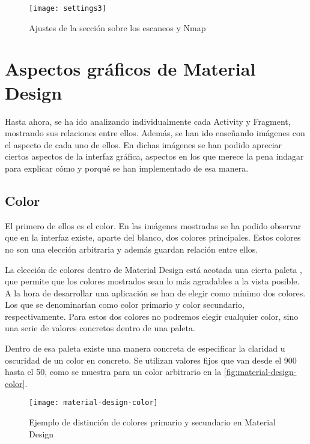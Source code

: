 \begin{figure}[H]
	\centering
	\texttt{[image: settings3]}
	\caption{Ajustes de la sección sobre los escaneos y Nmap}
	\label{fig:settings3}
\end{figure}

\section{Aspectos gráficos de Material Design}

Hasta ahora, se ha ido analizando individualmente cada Activity y Fragment, mostrando sus relaciones entre ellos. Además, se han ido enseñando imágenes con el aspecto de cada uno de ellos. En dichas imágenes se han podido apreciar ciertos aspectos de la interfaz gráfica, aspectos en los que merece la pena indagar para explicar cómo y porqué se han implementado de esa manera.

\subsection{Color}

El primero de ellos es el color. En las imágenes mostradas se ha podido observar que en la interfaz existe, aparte del blanco, dos colores principales. Estos colores no son una elección arbitraria y además guardan relación entre ellos.

La elección de colores dentro de Material Design está acotada una cierta paleta \cite{mat-des-color}, que permite que los colores mostrados sean lo más agradables a la vista posible. A la hora de desarrollar una aplicación se han de elegir como mínimo dos colores. Los que se denominarían como color primario y color secundario, respectivamente. Para estos dos colores no podremos elegir cualquier color, sino una serie de valores concretos dentro de una paleta.

Dentro de esa paleta existe una manera concreta de especificar la claridad u oscuridad de un color en concreto. Se utilizan valores fijos que van desde el 900 hasta el 50, como se muestra para un color arbitrario en la \autoref{fig:material-design-color}.

\begin{figure}[H]
	\centering
	\texttt{[image: material-design-color]}
	\caption{Ejemplo de distinción de colores primario y secundario en Material Design}
	\label{fig:material-design-color}
\end{figure}

